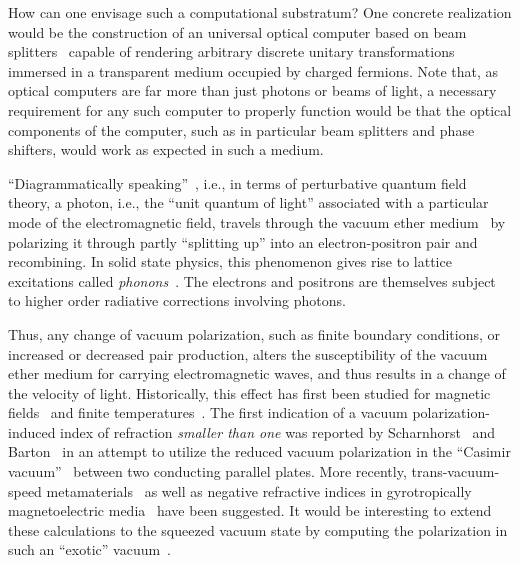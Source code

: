 \documentclass[12pt]{article}
\begin{document}
How can one envisage such a computational substratum?
One concrete realization would be the construction of an universal optical computer based on
beam splitters~\citep{zeilinger:882}
capable of rendering arbitrary discrete unitary transformations~\citep{rzbb,zukowski-97,svozil-2004-analog} immersed in a transparent medium occupied by charged fermions.
Note that, as optical computers are far more than just photons or beams of light,
a necessary requirement for any such computer to properly function
would be that the optical components of the computer, such as in particular beam splitters and phase shifters,
would work as expected in such a medium.

``Diagrammatically speaking''~\citep{feynman-62,schweber-62,thooft-Veltman_Diagrammar}, i.e., in terms of perturbative quantum field theory,
a photon, i.e., the ``unit quantum of light''
associated with a particular mode of the electromagnetic field,
travels through the vacuum ether medium~\citep{dirac-aether} by polarizing it
through partly ``splitting up'' into an electron-positron pair and recombining.
In solid state physics, this phenomenon gives rise to lattice excitations called {\em phonons}~\citep{stroscio}.
The electrons and positrons are themselves subject to higher order radiative corrections involving photons.

Thus, any change of vacuum polarization, such as finite boundary conditions, or increased or decreased pair production,
alters the susceptibility of the vacuum ether medium for carrying electromagnetic waves,
and thus results in a change of the velocity of light.
Historically, this effect has first been studied
for magnetic fields~\citep{er:61,RevModPhys.38.626,Adler1971599} and finite temperatures~\citep{Gies1998420}.
The first indication of a vacuum polarization-induced index of refraction {\em smaller than one} was reported by
Scharnhorst~\citep{scharnhorst,milonni,Scharnhorst-1998} and Barton~\citep{barton,0305-4470-26-8-024}
in an attempt to utilize the reduced vacuum polarization
in the ``Casimir vacuum''~\citep{milonni-book} between two conducting parallel plates.
More recently, trans-vacuum-speed
metamaterials~\citep{PhysRevE.63.046604,PhysRevE.68.026612,PhysRevE.70.068601,PhysRevE.70.068602,PhysRevE.78.016601}
as well as negative refractive indices in gyrotropically magnetoelectric media~\citep{PhysRevB.75.196101} have been suggested.
It would be interesting to extend these calculations to the squeezed vacuum state by computing the polarization in such an ``exotic'' vacuum~\citep{svozil-putz}.
\end{document}
